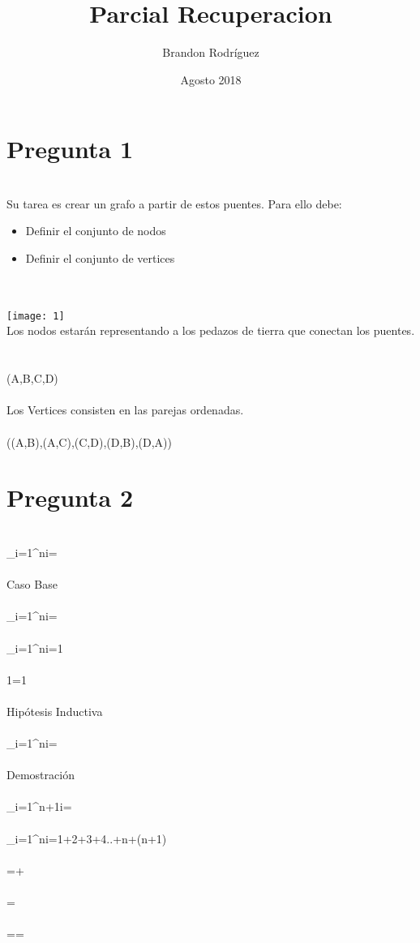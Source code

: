 \documentclass{article}
\title{Parcial Recuperacion}
\author{Brandon Rodríguez }
\date{Agosto 2018}
\begin{document}
\maketitle

\section{Pregunta 1}
\\
Su tarea es crear un grafo a partir de estos puentes. Para ello debe:
\begin{itemize}
        \item{Definir el conjunto de nodos}
        \item{Definir el conjunto de vertices}
\end{itemize}
\\
\\
\texttt{[image: 1]}
\\Los nodos estarán representando a los pedazos de tierra que conectan los puentes. 
\\
\\
\\(A,B,C,D)
\\\
\\Los Vertices consisten en las parejas ordenadas. 
\\
\\
((A,B),(A,C),(C,D),(D,B),(D,A))





\section{Pregunta 2}
\\
 \sum_{i=1}^{n}{i}=
\\
\\
Caso Base
\\
\\
 \sum_{i=1}^{n}{i}=
 \\
 \\
  \sum_{i=1}^{n}{i}=1
 \\
 \\
 1=1
 \\
 \\
Hipótesis Inductiva
\\
\\
 \sum_{i=1}^{n}{i}=
\\
\\
Demostración
\\
\\
 \sum_{i=1}^{n+1}{i}=
 \\
 \\
  \sum_{i=1}^{n}{i}=1+2+3+4..+n+(n+1)
 \\
 \\
  =+
 \\
 \\
 =
 \\
 \\
  ==
 \\
 \\
\end{document}
